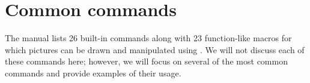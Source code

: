 \section{Common commands}
\label{sec:commoncmds}

The \MP{} manual \cite{hobby:user} lists 26 built-in commands along with 23 function-like macros for which pictures can be drawn and manipulated using \MP.  We will not discuss each of these commands here; however, we will focus on several of the most common commands and provide examples of their usage.




